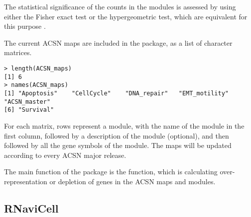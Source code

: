 \documentclass[article]{jss}
\begin{document}
The statistical significance of the counts in the modules is assessed by using
either the Fisher exact test \citep{fisher1922interpretation,
fisher1934statistical} or the hypergeometric test, which are equivalent for this
purpose \cite{rivals2007enrichment}.

The current ACSN maps are included in the  package, as a list of character matrices.

\begin{verbatim}
> length(ACSN_maps)
[1] 6
> names(ACSN_maps)
[1] "Apoptosis"    "CellCycle"    "DNA_repair"   "EMT_motility" "ACSN_master" 
[6] "Survival"    
\end{verbatim}

For each matrix, rows represent a module, with the name of the module in the
first column, followed by a description of the module (optional), and then
followed by all the gene symbols of the module. The maps will be updated
according to every ACSN major release.

The main function of the  package is the 
function, which is calculating over-representation or depletion of genes in the
ACSN maps and modules.


\subsection{RNaviCell}



%

\end{document}
